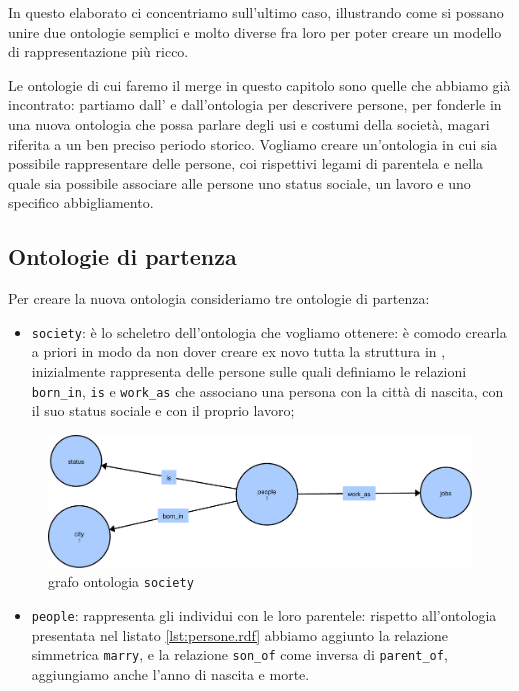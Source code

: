 In questo elaborato ci concentriamo sull'ultimo caso, illustrando come si possano unire due ontologie semplici e molto diverse fra loro per poter creare un modello di rappresentazione più ricco.

Le ontologie di cui faremo il merge in questo capitolo sono quelle che abbiamo già incontrato: partiamo dall' e dall'ontologia per descrivere persone, per fonderle in una nuova ontologia che possa parlare degli usi e costumi della società, magari riferita a un ben preciso periodo storico. Vogliamo creare un'ontologia in cui sia possibile rappresentare delle persone, coi rispettivi legami di parentela e nella quale sia possibile associare alle persone uno status sociale, un lavoro e uno specifico abbigliamento.

\subsection{Ontologie di partenza}
Per creare la nuova ontologia consideriamo tre ontologie di partenza:
\begin{itemize}
	\item \verb|society|: è lo scheletro dell'ontologia che vogliamo ottenere: è comodo crearla a priori in modo da non dover creare ex novo tutta la struttura in \cduce, inizialmente rappresenta delle persone sulle quali definiamo le relazioni \verb|born_in|, \verb|is| e \verb|work_as| che associano una persona con la città di nascita, con il suo status sociale e con il proprio lavoro;
\end{itemize}
\begin{figure}[H]
	\centering
	\includegraphics[width=.9\textwidth]{Picture/society.rdf.pdf}
	\caption{grafo ontologia \texttt{society}}
\end{figure}
\begin{itemize}
	\item \verb|people|: rappresenta gli individui con le loro parentele: rispetto all'ontologia presentata nel listato \ref{lst:persone.rdf} abbiamo aggiunto la relazione simmetrica \verb|marry|, e la relazione \verb|son_of| come inversa di \verb|parent_of|, aggiungiamo anche l'anno di nascita e morte.
\end{itemize}
